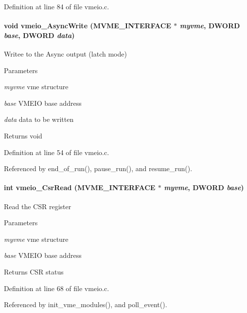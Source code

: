 Definition at line 84 of file vmeio.c.
\paragraph[{vmeio\_\-AsyncWrite}]{\setlength{\rightskip}{0pt plus 5cm}void vmeio\_\-AsyncWrite ({\bf MVME\_\-INTERFACE} $\ast$ {\em myvme}, \/  {\bf DWORD} {\em base}, \/  {\bf DWORD} {\em data})}\hfill\label{vmeio_8c_a55bfbc8acc81f96641ce87521deb9f53}
Writee to the Async output (latch mode) 
\begin{DoxyParams}{Parameters}
\item[{\em myvme}]vme structure \item[{\em base}]VMEIO base address \item[{\em data}]data to be written \end{DoxyParams}
\begin{DoxyReturn}{Returns}
void 
\end{DoxyReturn}


Definition at line 54 of file vmeio.c.

Referenced by end\_\-of\_\-run(), pause\_\-run(), and resume\_\-run().
\paragraph[{vmeio\_\-CsrRead}]{\setlength{\rightskip}{0pt plus 5cm}int vmeio\_\-CsrRead ({\bf MVME\_\-INTERFACE} $\ast$ {\em myvme}, \/  {\bf DWORD} {\em base})}\hfill\label{vmeio_8c_af6e6d51d02e674a8a2f313c12bf98a1b}
Read the CSR register 
\begin{DoxyParams}{Parameters}
\item[{\em myvme}]vme structure \item[{\em base}]VMEIO base address \end{DoxyParams}
\begin{DoxyReturn}{Returns}
CSR status 
\end{DoxyReturn}


Definition at line 68 of file vmeio.c.

Referenced by init\_\-vme\_\-modules(), and poll\_\-event().
